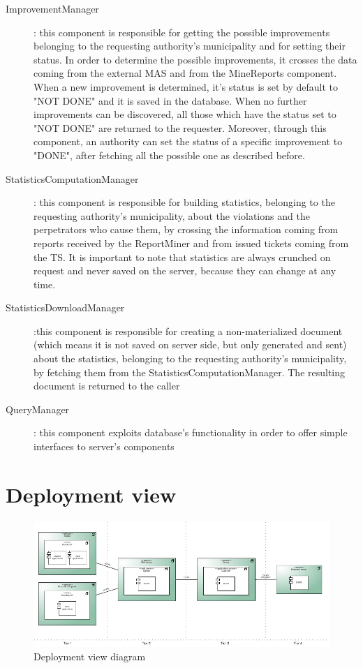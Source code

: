 \begin{description}
				\item[ImprovementManager]: this component is responsible for getting the possible improvements belonging to the requesting authority's municipality and for setting their status. In order to determine the possible improvements, it crosses the data coming from the external MAS and from the MineReports component. When a new improvement is determined, it's status is set by default to "NOT DONE" and it is saved in the database. When no further improvements can be discovered, all those which have the status set to "NOT DONE" are returned to the requester. Moreover, through this component, an authority can set the status of a specific improvement to "DONE", after fetching all the possible one as described before. 
				\item[StatisticsComputationManager]: this component is responsible for building statistics, belonging to the requesting authority's municipality, about the violations and the perpetrators who cause them, by crossing the information coming from reports received by the ReportMiner and from issued tickets coming from the TS. It is important to note that statistics are always crunched on request and never saved on the server, because they can change at any time.
				\item[StatisticsDownloadManager]:this component is responsible for creating a non-materialized document (which means it is not saved on server side, but only generated and sent) about the statistics, belonging to the requesting authority's municipality,  by fetching them from the StatisticsComputationManager. The resulting document is returned to the caller
				\item[QueryManager]: this component exploits database's functionality in order to offer simple interfaces to server's components
			\end{description}
		\section{Deployment view}
			\begin{figure}[!h]
				\centering
				\includegraphics[width=\textwidth]{images/DD2/DeploymentView.pdf}
				\caption{Deployment view diagram}
			\end{figure}
